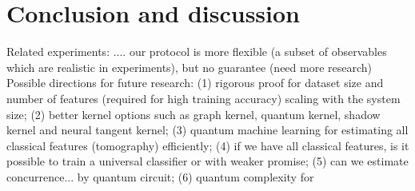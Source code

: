 \documentclass[
aps,
pra,
twocolumn,
floatfix,
]{revtex4-2}
\theoremstyle{plain}
\theoremstyle{definition}
\newcommand{\dm}{\rho}
\begin{document}

\section{Conclusion and discussion}\label{sec:conclusion}
Related experiments: ....
our protocol is more flexible (a subset of observables which are realistic in experiments),
but no guarantee (need more research)
Possible directions for future research:
(1) rigorous proof for dataset size and number of features (required for high training accuracy) scaling with the system size;
(2) better kernel options such as graph kernel, quantum kernel, shadow kernel and neural tangent kernel;
(3) quantum machine learning for estimating all classical features (tomography) efficiently;
(4) if we have all classical features, is it possible to train a universal classifier or with weaker promise;
(5) can we estimate concurrence... by quantum circuit;
(6) quantum complexity for 
\end{document}

